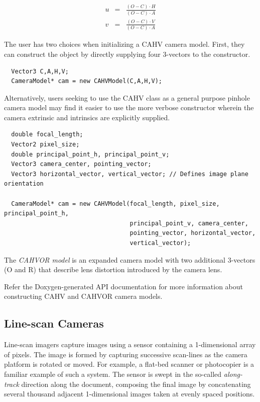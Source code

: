 \begin{eqnarray}
u & = & \frac{(O-C) \cdot H}{(O-C) \cdot A}\\
v & = & \frac{(O-C) \cdot V}{(O-C) \cdot A}
\end{eqnarray}

The user has two choices when initializing a CAHV camera model.
First, they can construct the object by directly supplying four
3-vectors to the constructor.

\begin{verbatim}
  Vector3 C,A,H,V;
  CameraModel* cam = new CAHVModel(C,A,H,V);
\end{verbatim}

Alternatively, users seeking to use the CAHV class as a general purpose pinhole
camera model may find it easier to use the more verbose constructor
wherein the camera extrinsic and intrinsics are explicitly supplied.

\begin{verbatim}
  double focal_length;
  Vector2 pixel_size;
  double principal_point_h, principal_point_v;
  Vector3 camera_center, pointing_vector;
  Vector3 horizontal_vector, vertical_vector; // Defines image plane orientation

  CameraModel* cam = new CAHVModel(focal_length, pixel_size, principal_point_h, 
                                   principal_point_v, camera_center, 
                                   pointing_vector, horizontal_vector,
                                   vertical_vector);  
\end{verbatim}


The {\em CAHVOR model} is an expanded camera model with two additional
3-vectors (O and R) that describe lens distortion introduced by the
camera lens.

Refer the Doxygen-generated API documentation for more information
about constructing CAHV and CAHVOR camera models.

\subsection{Line-scan Cameras}

Line-scan imagers capture images using a sensor containing a
1-dimensional array of pixels.  The image is formed by capturing
successive scan-lines as the camera platform is rotated or moved.  For
example, a flat-bed scanner or photocopier is a familiar example of
such a system.  The sensor is swept in the so-called {\em along-track}
direction along the document, composing the final image by
concatenating several thousand adjacent 1-dimensional images taken at
evenly spaced positions.

